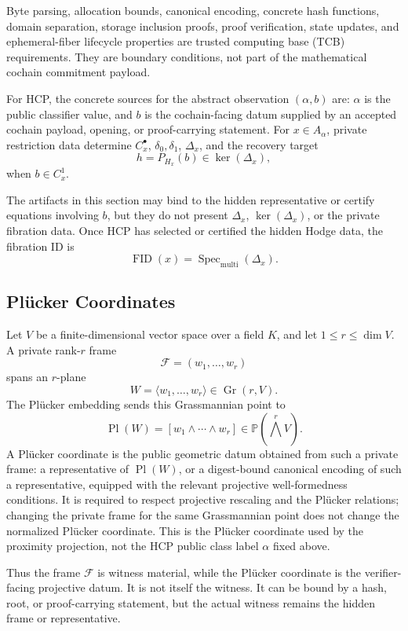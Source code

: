 Byte parsing, allocation bounds, canonical encoding, concrete hash functions,
domain separation, storage inclusion proofs, proof verification, state updates,
and ephemeral-fiber lifecycle properties are trusted computing base (TCB)
requirements. They are boundary
conditions, not part of the mathematical cochain commitment payload.

For HCP, the concrete sources for the abstract observation \((\alpha,b)\) are:
\(\alpha\) is the public classifier value, and \(b\) is the cochain-facing datum
supplied by an accepted cochain payload, opening, or proof-carrying statement.
For \(x\in A_\alpha\), private restriction data determine \(C_x^\bullet\),
\(\delta_0,\delta_1\), \(\Delta_x\), and the recovery target
\[
  h=P_{H_x}(b)\in\ker(\Delta_x),
\]
when \(b\in C_x^1\).

The artifacts in this section may bind to the hidden representative or certify
equations involving \(b\), but they do not present \(\Delta_x\),
\(\ker(\Delta_x)\), or the private fibration data. Once HCP has selected or
certified the hidden Hodge data, the fibration ID is
\[
  \operatorname{FID}(x)=\operatorname{Spec}_{\mathrm{multi}}(\Delta_x).
\]

\subsection{Pl\"ucker Coordinates}

Let \(V\) be a finite-dimensional vector space over a field \(K\), and let
\(1\le r\le \dim V\). A private rank-\(r\) frame
\[
  \mathcal F=(w_1,\ldots,w_r)
\]
spans an \(r\)-plane
\[
  W=\langle w_1,\ldots,w_r\rangle\in \operatorname{Gr}(r,V).
\]
The Pl\"ucker embedding sends this Grassmannian point to
\[
  \operatorname{Pl}(W)
  =
  [w_1\wedge\cdots\wedge w_r]
  \in \mathbb P(\bigwedge^r V).
\]
A Pl\"ucker coordinate is the public geometric datum obtained from such a private
frame: a representative of \(\operatorname{Pl}(W)\), or a digest-bound
canonical encoding of such a representative, equipped with the relevant
projective well-formedness conditions. It is required to respect projective
rescaling and the Pl\"ucker relations; changing the private frame for the same
Grassmannian point does not change the normalized Pl\"ucker coordinate.
This is the Pl\"ucker coordinate used by the proximity projection, not the HCP
public class label \(\alpha\) fixed above.

Thus the frame \(\mathcal F\) is witness material, while the Pl\"ucker coordinate is the
verifier-facing projective datum. It is not itself the witness. It can be bound
by a hash, root, or proof-carrying statement, but the actual witness remains
the hidden frame or representative.

